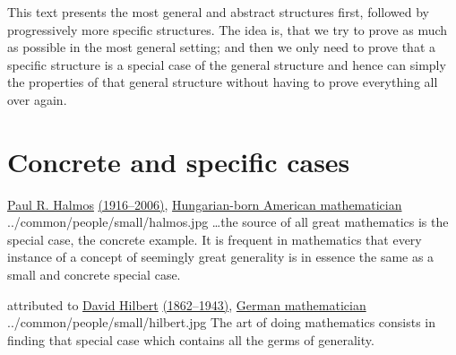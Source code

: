 This text presents the most general and abstract structures first,
followed by progressively more specific structures.
The idea is, that we try to prove as much as possible in the most general setting;
and then we only need to prove that a specific structure is a special case of the general
structure and hence can simply  the properties of that general structure
without having to prove everything all over again.


\section*{Concrete and specific cases}

\qboxnps
  {\href{http://en.wikipedia.org/wiki/Paul_Halmos}{Paul R. Halmos}
   \href{http://www-history.mcs.st-andrews.ac.uk/Timelines/TimelineG.html}{(1916--2006)},
   \href{http://www-history.mcs.st-andrews.ac.uk/BirthplaceMaps/Places/Germany.html}{Hungarian-born American mathematician}
   \footnotemark
  }
  {../common/people/small/halmos.jpg}
  {\ldots the source of all great mathematics is the special case,
    the concrete example.
    It is frequent in mathematics that every instance of a concept of seemingly
    great generality is in essence the same as a small and concrete special case.}



\qboxnps
  {attributed to \href{http://en.wikipedia.org/wiki/Hilbert}{David Hilbert}
   \href{http://www-history.mcs.st-andrews.ac.uk/Timelines/TimelineF.html}{(1862--1943)},
   \href{http://www-history.mcs.st-andrews.ac.uk/BirthplaceMaps/Places/Germany.html}{German mathematician}
    \footnotemark
  }
  {../common/people/small/hilbert.jpg}
  {The art of doing mathematics consists in finding
    that special case which contains all the germs of generality.}

